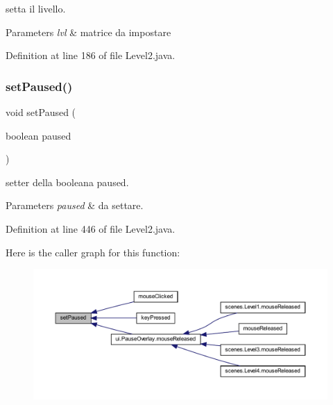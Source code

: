 setta il livello. 


\begin{DoxyParams}{Parameters}
{\em lvl} & matrice da impostare \\
\hline
\end{DoxyParams}


Definition at line 186 of file Level2.\+java.

\mbox{\label{classscenes_1_1_level2_aeab1551e3e372c6402076c04ea9002bb}} 
\subsubsection{\texorpdfstring{set\+Paused()}{setPaused()}}
{\footnotesize\ttfamily void set\+Paused (\begin{DoxyParamCaption}\item[{boolean}]{paused }\end{DoxyParamCaption})}



setter della booleana paused. 


\begin{DoxyParams}{Parameters}
{\em paused} & da settare. \\
\hline
\end{DoxyParams}


Definition at line 446 of file Level2.\+java.

Here is the caller graph for this function\+:\nopagebreak
\begin{figure}[H]
\begin{center}
\leavevmode
\includegraphics[width=350pt]{classscenes_1_1_level2_aeab1551e3e372c6402076c04ea9002bb_icgraph}
\end{center}
\end{figure}
\mbox{\label{classscenes_1_1_level2_ac9525f397417cae10d3de076f5b2e9d3}} 
